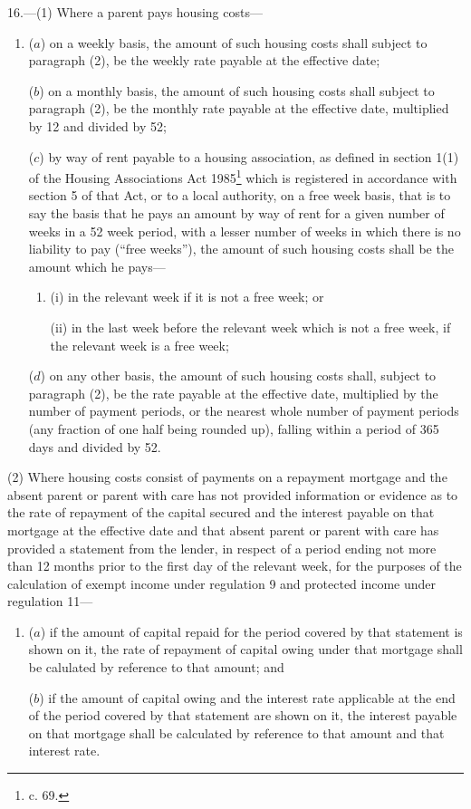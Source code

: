\documentclass[12pt,a4paper]{article}
\begin{document}
16.—(1) Where a parent pays housing costs—
\begin{enumerate}\item[]
($a$) on a weekly basis, the amount of such housing costs shall subject to paragraph (2), be the weekly rate payable at the effective date;

($b$) on a monthly basis, the amount of such housing costs shall subject to paragraph (2), be the monthly rate payable at the effective date, multiplied by 12 and divided by 52;

($c$) by way of rent payable to a housing association, as defined in section 1(1) of the Housing Associations Act 1985\footnote{ c. 69.} which is registered in accordance with section 5 of that Act, or to a local authority, on a free week basis, that is to say the basis that he pays an amount by way of rent for a given number of weeks in a 52 week period, with a lesser number of weeks in which there is no liability to pay (“free weeks”), the amount of such housing costs shall be the amount which he pays—
\begin{enumerate}\item[]
(i) in the relevant week if it is not a free week; or

(ii) in the last week before the relevant week which is not a free week, if the relevant week is a free week;
\end{enumerate}

($d$) on any other basis, the amount of such housing costs shall, subject to paragraph (2), be the rate payable at the effective date, multiplied by the number of payment periods, or the nearest whole number of payment periods (any fraction of one half being rounded up), falling within a period of 365 days and divided by 52.
\end{enumerate}

(2) Where housing costs consist of payments on a repayment mortgage and the absent parent or parent with care has not provided information or evidence as to the rate of repayment of the capital secured and the interest payable on that mortgage at the effective date and that absent parent or parent with care has provided a statement from the lender, in respect of a period ending not more than 12 months prior to the first day of the relevant week, for the purposes of the calculation of exempt income under regulation 9 and protected income under regulation 11—
\begin{enumerate}\item[]
($a$) if the amount of capital repaid for the period covered by that statement is shown on it, the rate of repayment of capital owing under that mortgage shall be calulated by reference to that amount; and

($b$) if the amount of capital owing and the interest rate applicable at the end of the period covered by that statement are shown on it, the interest payable on that mortgage shall be calculated by reference to that amount and that interest rate.
\end{enumerate}
\end{document}
